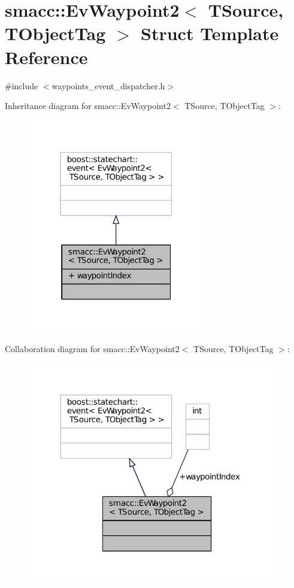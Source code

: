 \hypertarget{structsmacc_1_1EvWaypoint2}{}\section{smacc\+:\+:Ev\+Waypoint2$<$ T\+Source, T\+Object\+Tag $>$ Struct Template Reference}
\label{structsmacc_1_1EvWaypoint2}


{\ttfamily \#include $<$waypoints\+\_\+event\+\_\+dispatcher.\+h$>$}



Inheritance diagram for smacc\+:\+:Ev\+Waypoint2$<$ T\+Source, T\+Object\+Tag $>$\+:
\nopagebreak
\begin{figure}[H]
\begin{center}
\leavevmode
\includegraphics[width=219pt]{structsmacc_1_1EvWaypoint2__inherit__graph}
\end{center}
\end{figure}


Collaboration diagram for smacc\+:\+:Ev\+Waypoint2$<$ T\+Source, T\+Object\+Tag $>$\+:
\nopagebreak
\begin{figure}[H]
\begin{center}
\leavevmode
\includegraphics[width=305pt]{structsmacc_1_1EvWaypoint2__coll__graph}
\end{center}
\end{figure}
